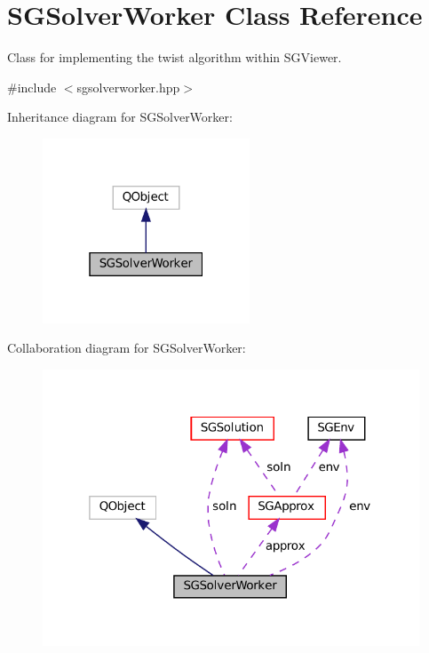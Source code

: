 \hypertarget{classSGSolverWorker}{}\section{S\+G\+Solver\+Worker Class Reference}
\label{classSGSolverWorker}


Class for implementing the twist algorithm within S\+G\+Viewer.  




{\ttfamily \#include $<$sgsolverworker.\+hpp$>$}



Inheritance diagram for S\+G\+Solver\+Worker\+:
\nopagebreak
\begin{figure}[H]
\begin{center}
\leavevmode
\includegraphics[width=175pt]{classSGSolverWorker__inherit__graph}
\end{center}
\end{figure}


Collaboration diagram for S\+G\+Solver\+Worker\+:
\nopagebreak
\begin{figure}[H]
\begin{center}
\leavevmode
\includegraphics[width=319pt]{classSGSolverWorker__coll__graph}
\end{center}
\end{figure}

